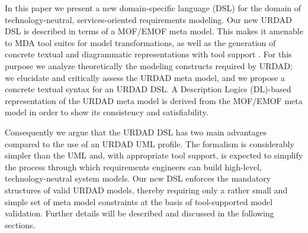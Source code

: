 In this paper we present a new domain-specific language 
(DSL) for the domain of technology-neutral, services-oriented 
requirements modeling. Our new URDAD DSL is described in terms 
of a MOF/EMOF meta model. This makes it amenable to MDA tool 
suites for model transformations, as well as the generation 
of concrete textual and diagrammatic representations with 
tool support \cite{gronback_model_2008}. For this purpose
we analyze theoretically the modeling constructs required 
by URDAD; we elucidate and critically assess the URDAD meta 
model, and we propose a concrete textual syntax for an URDAD 
DSL. A Description Logics (DL)-based representation of the 
URDAD meta model is derived from the MOF/EMOF meta model 
in order to show its consistency and satisfiability.

Consequently we argue that the URDAD DSL has two main 
advantages compared to the use of an URDAD UML profile. 
The formalism is considerably simpler than the UML and, 
with appropriate tool support, is expected to simplify 
the process through which requirements engineers can 
build high-level, technology-neutral system models.
Our new DSL enforces the mandatory structures of 
valid URDAD models, thereby requiring only a rather 
small and simple set of meta model constraints at the
basis of tool-supported model validation. Further details 
will be described and discussed in the following sections.

